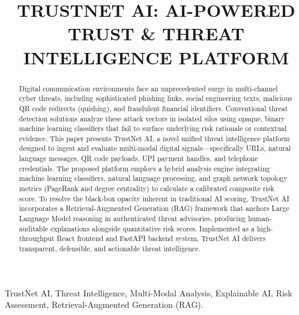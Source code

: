 \documentclass[conference,a4paper]{IEEEtran}
\begin{document}
\title{TRUSTNET AI: AI-POWERED TRUST \& THREAT INTELLIGENCE PLATFORM}

\author{
}

\maketitle

\begin{abstract}
Digital communication environments face an unprecedented surge in multi-channel cyber threats, including sophisticated phishing links, social engineering texts, malicious QR code redirects (quishing), and fraudulent financial identifiers. Conventional threat detection solutions analyze these attack vectors in isolated silos using opaque, binary machine learning classifiers that fail to surface underlying risk rationale or contextual evidence. This paper presents TrustNet AI, a novel unified threat intelligence platform designed to ingest and evaluate multi-modal digital signals—specifically URLs, natural language messages, QR code payloads, UPI payment handles, and telephone credentials. The proposed platform employs a hybrid analysis engine integrating machine learning classifiers, natural language processing, and graph network topology metrics (PageRank and degree centrality) to calculate a calibrated composite risk score. To resolve the black-box opacity inherent in traditional AI scoring, TrustNet AI incorporates a Retrieval-Augmented Generation (RAG) framework that anchors Large Language Model reasoning in authenticated threat advisories, producing human-auditable explanations alongside quantitative risk scores. Implemented as a high-throughput React frontend and FastAPI backend system, TrustNet AI delivers transparent, defensible, and actionable threat intelligence.
\end{abstract}

\begin{IEEEkeywords}
TrustNet AI, Threat Intelligence, Multi-Modal Analysis, Explainable AI, Risk Assessment, Retrieval-Augmented Generation (RAG).
\end{IEEEkeywords}
\end{document}
